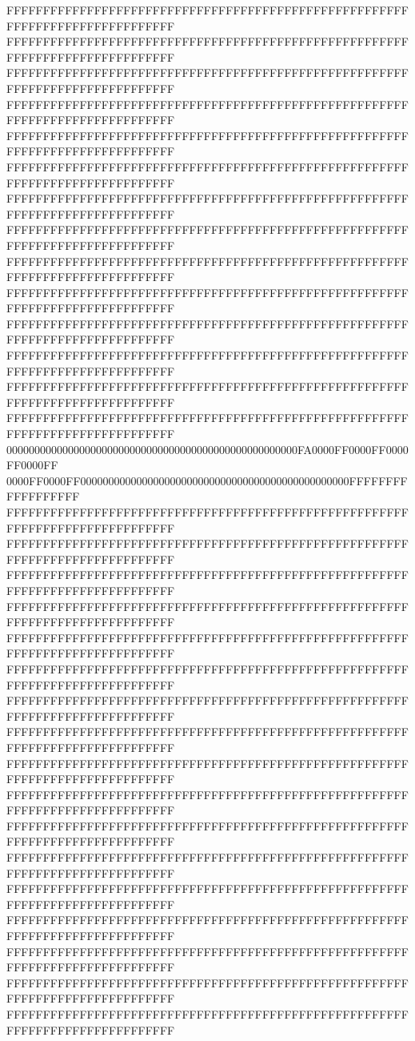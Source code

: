 FFFFFFFFFFFFFFFFFFFFFFFFFFFFFFFFFFFFFFFFFFFFFFFFFFFFFFFFFFFFFFFFFFFFFFFFFFFFFF
FFFFFFFFFFFFFFFFFFFFFFFFFFFFFFFFFFFFFFFFFFFFFFFFFFFFFFFFFFFFFFFFFFFFFFFFFFFFFF
FFFFFFFFFFFFFFFFFFFFFFFFFFFFFFFFFFFFFFFFFFFFFFFFFFFFFFFFFFFFFFFFFFFFFFFFFFFFFF
FFFFFFFFFFFFFFFFFFFFFFFFFFFFFFFFFFFFFFFFFFFFFFFFFFFFFFFFFFFFFFFFFFFFFFFFFFFFFF
FFFFFFFFFFFFFFFFFFFFFFFFFFFFFFFFFFFFFFFFFFFFFFFFFFFFFFFFFFFFFFFFFFFFFFFFFFFFFF
FFFFFFFFFFFFFFFFFFFFFFFFFFFFFFFFFFFFFFFFFFFFFFFFFFFFFFFFFFFFFFFFFFFFFFFFFFFFFF
FFFFFFFFFFFFFFFFFFFFFFFFFFFFFFFFFFFFFFFFFFFFFFFFFFFFFFFFFFFFFFFFFFFFFFFFFFFFFF
FFFFFFFFFFFFFFFFFFFFFFFFFFFFFFFFFFFFFFFFFFFFFFFFFFFFFFFFFFFFFFFFFFFFFFFFFFFFFF
FFFFFFFFFFFFFFFFFFFFFFFFFFFFFFFFFFFFFFFFFFFFFFFFFFFFFFFFFFFFFFFFFFFFFFFFFFFFFF
FFFFFFFFFFFFFFFFFFFFFFFFFFFFFFFFFFFFFFFFFFFFFFFFFFFFFFFFFFFFFFFFFFFFFFFFFFFFFF
FFFFFFFFFFFFFFFFFFFFFFFFFFFFFFFFFFFFFFFFFFFFFFFFFFFFFFFFFFFFFFFFFFFFFFFFFFFFFF
FFFFFFFFFFFFFFFFFFFFFFFFFFFFFFFFFFFFFFFFFFFFFFFFFFFFFFFFFFFFFFFFFFFFFFFFFFFFFF
FFFFFFFFFFFFFFFFFFFFFFFFFFFFFFFFFFFFFFFFFFFFFFFFFFFFFFFFFFFFFFFFFFFFFFFFFFFFFF
FFFFFFFFFFFFFFFFFFFFFFFFFFFFFFFFFFFFFFFFFFFFFFFFFFFFFFFFFFFFFFFFFFFFFFFFFFFFFF
0000000000000000000000000000000000000000000000000000FA0000FF0000FF0000FF0000FF
0000FF0000FF000000000000000000000000000000000000000000000000FFFFFFFFFFFFFFFFFF
FFFFFFFFFFFFFFFFFFFFFFFFFFFFFFFFFFFFFFFFFFFFFFFFFFFFFFFFFFFFFFFFFFFFFFFFFFFFFF
FFFFFFFFFFFFFFFFFFFFFFFFFFFFFFFFFFFFFFFFFFFFFFFFFFFFFFFFFFFFFFFFFFFFFFFFFFFFFF
FFFFFFFFFFFFFFFFFFFFFFFFFFFFFFFFFFFFFFFFFFFFFFFFFFFFFFFFFFFFFFFFFFFFFFFFFFFFFF
FFFFFFFFFFFFFFFFFFFFFFFFFFFFFFFFFFFFFFFFFFFFFFFFFFFFFFFFFFFFFFFFFFFFFFFFFFFFFF
FFFFFFFFFFFFFFFFFFFFFFFFFFFFFFFFFFFFFFFFFFFFFFFFFFFFFFFFFFFFFFFFFFFFFFFFFFFFFF
FFFFFFFFFFFFFFFFFFFFFFFFFFFFFFFFFFFFFFFFFFFFFFFFFFFFFFFFFFFFFFFFFFFFFFFFFFFFFF
FFFFFFFFFFFFFFFFFFFFFFFFFFFFFFFFFFFFFFFFFFFFFFFFFFFFFFFFFFFFFFFFFFFFFFFFFFFFFF
FFFFFFFFFFFFFFFFFFFFFFFFFFFFFFFFFFFFFFFFFFFFFFFFFFFFFFFFFFFFFFFFFFFFFFFFFFFFFF
FFFFFFFFFFFFFFFFFFFFFFFFFFFFFFFFFFFFFFFFFFFFFFFFFFFFFFFFFFFFFFFFFFFFFFFFFFFFFF
FFFFFFFFFFFFFFFFFFFFFFFFFFFFFFFFFFFFFFFFFFFFFFFFFFFFFFFFFFFFFFFFFFFFFFFFFFFFFF
FFFFFFFFFFFFFFFFFFFFFFFFFFFFFFFFFFFFFFFFFFFFFFFFFFFFFFFFFFFFFFFFFFFFFFFFFFFFFF
FFFFFFFFFFFFFFFFFFFFFFFFFFFFFFFFFFFFFFFFFFFFFFFFFFFFFFFFFFFFFFFFFFFFFFFFFFFFFF
FFFFFFFFFFFFFFFFFFFFFFFFFFFFFFFFFFFFFFFFFFFFFFFFFFFFFFFFFFFFFFFFFFFFFFFFFFFFFF
FFFFFFFFFFFFFFFFFFFFFFFFFFFFFFFFFFFFFFFFFFFFFFFFFFFFFFFFFFFFFFFFFFFFFFFFFFFFFF
FFFFFFFFFFFFFFFFFFFFFFFFFFFFFFFFFFFFFFFFFFFFFFFFFFFFFFFFFFFFFFFFFFFFFFFFFFFFFF
FFFFFFFFFFFFFFFFFFFFFFFFFFFFFFFFFFFFFFFFFFFFFFFFFFFFFFFFFFFFFFFFFFFFFFFFFFFFFF
FFFFFFFFFFFFFFFFFFFFFFFFFFFFFFFFFFFFFFFFFFFFFFFFFFFFFFFFFFFFFFFFFFFFFFFFFFFFFF
